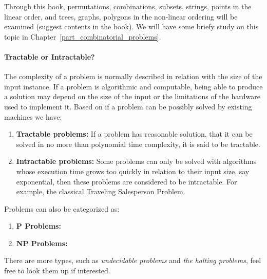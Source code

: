 \documentclass[../main.tex]{subfiles}
\begin{document}
Through this book, permutations, combinations, subsets, strings, points in the linear order, and trees, graphs, polygons in the non-linear ordering will be examined (suggest contents in the book). We will have some briefy study on this topic in Chapter~\ref{part_combinatorial_problems}.
\paragraph{Tractable or Intractable?}
The complexity of a problem is normally described in relation with the size of the input instance. If a problem is algorithmic and computable, being able to produce a solution may depend on the size of the input or the limitations of the hardware used to implement it. Based on if  a problem can be possibly solved by existing machines we have:
\begin{enumerate}
    \item \textbf{Tractable problems:} If a problem has reasonable solution, that it can be solved in no more than polynomial time complexity, it is said to be tractable. 
    \item \textbf{Intractable problems:} Some problems can only be solved with algorithms whose execution time grows too quickly in relation to their input size, say exponential, then these problems are considered to be intractable. For example, the classical Traveling Salesperson Problem. 
\end{enumerate}

Problems can also be categorized as:
\begin{enumerate}
    \item \textbf{P Problems:} 
    \item \textbf{NP Problems:}
\end{enumerate}
There are more types, such as \textit{undecidable problems} and \textit{the halting problems}, feel free to look them up if interested. 
\end{document}
